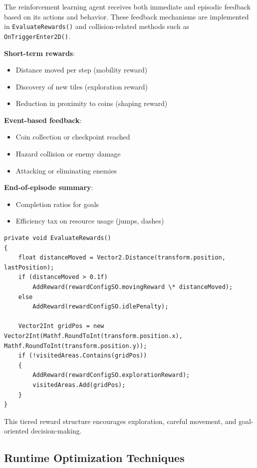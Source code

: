 \documentclass[12pt,oneside,openright,a4paper]{cpe-english-project}
\begin{document}
The reinforcement learning agent receives both immediate and episodic feedback based on its actions and behavior. These feedback mechanisms are implemented in \texttt{EvaluateRewards()} and collision-related methods such as \texttt{OnTriggerEnter2D()}.

\textbf{Short-term rewards}:
\begin{itemize}
\item Distance moved per step (mobility reward)
\item Discovery of new tiles (exploration reward)
\item Reduction in proximity to coins (shaping reward)
\end{itemize}

\textbf{Event-based feedback}:
\begin{itemize}
\item Coin collection or checkpoint reached
\item Hazard collision or enemy damage
\item Attacking or eliminating enemies
\end{itemize}

\textbf{End-of-episode summary}:
\begin{itemize}
\item Completion ratios for goals
\item Efficiency tax on resource usage (jumps, dashes)
\end{itemize}

\begin{lstlisting}[language={[Sharp]C}]
private void EvaluateRewards()
{
	float distanceMoved = Vector2.Distance(transform.position, lastPosition);
	if (distanceMoved > 0.1f)
		AddReward(rewardConfigSO.movingReward \* distanceMoved);
	else
		AddReward(rewardConfigSO.idlePenalty);
	
	Vector2Int gridPos = new Vector2Int(Mathf.RoundToInt(transform.position.x), Mathf.RoundToInt(transform.position.y));
	if (!visitedAreas.Contains(gridPos))
	{
		AddReward(rewardConfigSO.explorationReward);
		visitedAreas.Add(gridPos);
	}
}
\end{lstlisting}

This tiered reward structure encourages exploration, careful movement, and goal-oriented decision-making.


\subsection{Runtime Optimization Techniques}
\end{document}
